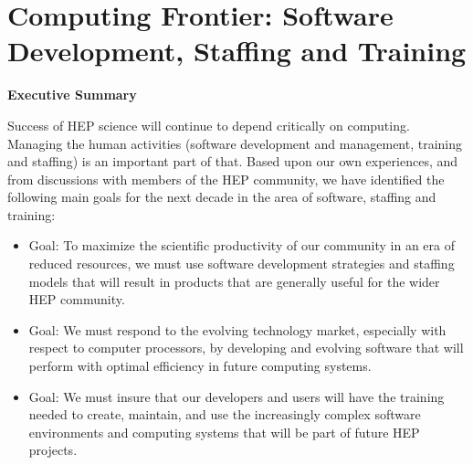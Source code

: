 

\chapter{Computing Frontier: Software Development, Staffing and Training}
\label{chap:CpFI4}
\def \HEP {HEP }

\begin{center}\begin{boldmath}

\begin{large} {\bf Executive Summary} \end{large}

%

\end{boldmath}\end{center}

Success of \HEP science will continue to depend critically on computing.
Managing the human activities (software development and management,
training and staffing) is an important part of that.  
Based upon our own experiences, and from
discussions with members of the \HEP community,
we have identified the following main goals for the next decade in the area
of software, staffing and training:

\begin{itemize}
\item Goal: To maximize the scientific productivity of our community
in an era of reduced resources, we must use
software development strategies and staffing models that will result in products
that are generally useful for the wider \HEP community.
\item Goal: We must respond to the evolving technology market, especially
with respect to computer processors, by
developing and evolving software that will perform with optimal efficiency
in future computing systems.
\item Goal: We must insure that our developers and users will have the
training needed to create, maintain, and use the increasingly complex software
environments and computing systems that will be part of future \HEP projects.
\end{itemize}

